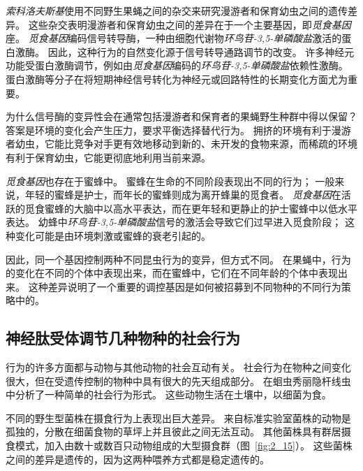\textit{索科洛夫斯基}使用不同野生果蝇之间的杂交来研究漫游者和保育幼虫之间的遗传差异。
这些杂交表明漫游者和保育幼虫之间的差异在于一个主要基因，即\textit{觅食基因}座。
\textit{觅食基因}编码信号转导酶，一种由细胞代谢物\textit{环鸟苷-3,5-单磷酸盐}激活的蛋白激酶。
因此，这种行为的自然变化源于信号转导通路调节的改变。
许多神经元功能受蛋白激酶调节，例如由\textit{觅食基因}编码的\textit{环鸟苷-3,5-单磷酸盐}依赖性激酶。
蛋白激酶等分子在将短期神经信号转化为神经元或回路特性的长期变化方面尤为重要。


为什么信号酶的变异性会在通常包括漫游者和保育者的果蝇野生种群中得以保留？
答案是环境的变化会产生压力，要求平衡选择替代行为。 
拥挤的环境有利于漫游者幼虫，它能比竞争对手更有效地移动到新的、未开发的食物来源，而稀疏的环境有利于保育幼虫，它能更彻底地利用当前来源。


\textit{觅食基因}也存在于蜜蜂中。
蜜蜂在生命的不同阶段表现出不同的行为；
一般来说，年轻的蜜蜂是护士，而年长的蜜蜂则成为离开蜂巢的觅食者。
\textit{觅食基因}在活跃的觅食蜜蜂的大脑中以高水平表达，而在更年轻和更静止的护士蜜蜂中以低水平表达。
幼蜂中\textit{环鸟苷-3,5-单磷酸盐}信号的激活会导致它们过早进入觅食阶段；
这种变化可能是由环境刺激或蜜蜂的衰老引起的。


因此，同一个基因控制两种不同昆虫行为的变异，但方式不同。
在果蝇中，行为的变化在不同的个体中表现出来，而在蜜蜂中，它们在不同年龄的个体中表现出来。
这种差异说明了一个重要的调控基因是如何被招募到不同物种的不同行为策略中的。



\subsection{神经肽受体调节几种物种的社会行为}

行为的许多方面都与动物与其他动物的社会互动有关。
社会行为在物种之间变化很大，但在受遗传控制的物种中具有很大的先天组成部分。
在蛔虫秀丽隐杆线虫中分析了一种简单的社会行为形式。 
这些动物生活在土壤中，以细菌为食。


不同的野生型菌株在摄食行为上表现出巨大差异。
来自标准实验室菌株的动物是孤独的，分散在细菌食物的草坪上并且彼此之间无法互动。
其他菌株具有群居摄食模式，加入由数十或数百只动物组成的大型摄食群（图~\ref{fig:2_15}）。
这些菌株之间的差异是遗传的，因为这两种喂养方式都是稳定遗传的。


